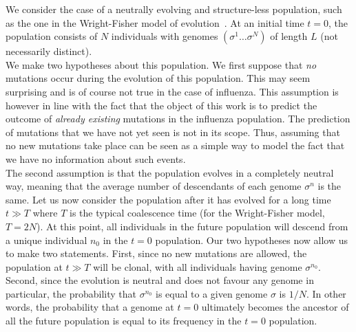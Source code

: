 \documentclass{article}
\begin{document}
	We consider the case of a neutrally evolving and structure-less population, such as the one in the Wright-Fisher model of evolution~\cite{10.1080/10635150500354860}. At an initial time $t=0$, the population consists of $N$ individuals with genomes $(\sigma^1\ldots\sigma^N)$ of length $L$ (not necessarily distinct). \\
	We make two hypotheses about this population. We first suppose that \emph{no} mutations occur during the evolution of this population. This may seem surprising and is of course not true in the case of influenza. This assumption is however in line with the fact that the object of this work is to predict the outcome of \emph{already existing} mutations in the influenza population. The prediction of mutations that we have not yet seen is not in its scope. Thus, assuming that no new mutations take place can be seen as a simple way to model the fact that we have no information about such events. \\
	The second assumption is that the population evolves in a completely neutral way, meaning that the average number of descendants of each genome $\sigma^n$ is the same. Let us now consider the population after it has evolved for a long time $t\gg T$ where $T$ is the typical coalescence time (for the Wright-Fisher model, $T=2N$). At this point, all individuals in the future population will descend from a unique individual $n_0$ in the $t=0$ population. Our two hypotheses now allow us to make two statements. First, since no new mutations are allowed, the population at $t\gg T$ will be clonal, with all individuals having genome $\sigma^{n_0}$. Second, since the evolution is neutral and does not favour any genome in particular, the probability that $\sigma^{n_0}$ is equal to a given genome $\sigma$ is $1/N$. In other words, the probability that a genome at $t=0$ ultimately becomes the ancestor of all the future population is equal to its frequency in the $t=0$ population. \\
\end{document}
